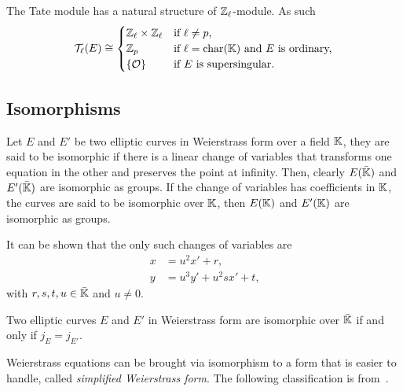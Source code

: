 \begin{proposition}
  The Tate module has a natural structure of
  $\mathbb{Z}_\ell$-module. As
  such
  \begin{equation}
    \label{eq:134}
    \mathcal{T}_\ell(E) \cong
    \begin{cases}
      \mathbb{Z}_\ell\times\mathbb{Z}_\ell &\text{if $\ell\ne p$,}\\
      \mathbb{Z}_p &\text{if $\ell=\operatorname{char}(\mathbb{K})$ and $E$ is ordinary,}\\
      \{\mathcal{O}\} &\text{if $E$ is supersingular.}
    \end{cases}
  \end{equation}
\end{proposition}


\subsection{Isomorphisms}
\label{sec:isomorphisms}

Let $E$ and $E'$ be two elliptic curves in Weierstrass form over a
field $\mathbb{K}$, they are said to be isomorphic if there is a linear change
of variables that transforms one equation in the other and preserves
the point at infinity.  Then, clearly $E(\bar{\mathbb{K}})$ and
$E'(\bar{\mathbb{K}})$ are isomorphic as groups. If the change of variables
has coefficients in $\mathbb{K}$, the curves are said to be
isomorphic
over $\mathbb{K}$, then $E(\mathbb{K})$ and $E'(\mathbb{K})$ are isomorphic as groups.

It can be shown that the only such changes of variables are
\begin{equation}
  \label{eq:116}
  \begin{aligned}
    x &= u^2x' + r\text{,}\\
    y &= u^3y' + u^2sx' + t\text{,}
  \end{aligned}
\end{equation}
with $r,s,t,u\in\bar{\mathbb{K}}$ and $u\ne0$.

\begin{proposition}
  Two elliptic curves $E$ and $E'$ in Weierstrass form are isomorphic
  over $\bar{\mathbb{K}}$ if and only if $j_E=j_{E'}$.
\end{proposition}

Weierstrass equations can be
brought via isomorphism to a form that is easier to handle, called
\emph{simplified Weierstrass form}. The following classification is
from~\cite{connell:elliptic}.

